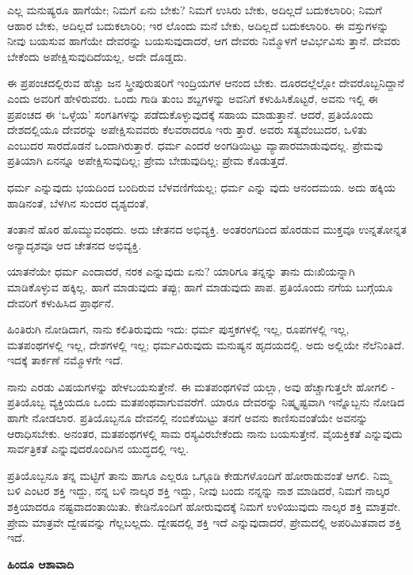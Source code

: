 ಎಲ್ಲ ಮನುಷ್ಯರೂ ಹಾಗೆಯೇ; ನಿಮಗೆ ಏನು ಬೇಕು? ನಿಮಗೆ ಉಸಿರು ಬೇಕು, ಅದಿಲ್ಲದೆ ಬದುಕಲಾರಿರಿ; ನಿಮಗೆ ಆಹಾರ ಬೇಕು, ಅದಿಲ್ಲದೆ ಬದುಕಲಾರಿರಿ; ಇರ ಲೊಂದು ಮನೆ ಬೇಕು, ಅದಿಲ್ಲದೆ ಬದುಕಲಾರಿರಿ. ಈ ವಸ್ತುಗಳನ್ನು ನೀವು ಬಯಸುವ ಹಾಗೆಯೇ ದೇವರನ್ನು ಬಯಸುವುದಾದರೆ, ಆಗ ದೇವರು ನಿಮ್ಮೊಳಗೆ ಆವಿರ್ಭವಿಸು ತ್ತಾನೆ. ದೇವರು ಬೇಕೆಂದು ಅಪೇಕ್ಷಿಸುವುದಿದೆಯಲ್ಲ, ಅದೇ ದೊಡ್ಡದು.

ಈ ಪ್ರಪಂಚದಲ್ಲಿರುವ ಹೆಚ್ಚು ಜನ ಸ್ತ್ರೀಪುರುಷರಿಗೆ ಇಂದ್ರಿಯಗಳ ಆನಂದ ಬೇಕು. ದೂರದಲ್ಲೆಲ್ಲೋ ದೇವರೊಬ್ಬನಿದ್ದಾನೆ ಎಂದು ಅವರಿಗೆ ಹೇಳಿರುವರು. ಒಂದು ಗಾಡಿ ತುಂಬ ಶಬ್ದಗಳನ್ನು ಅವನಿಗೆ ಕಳುಹಿಸಿಕೊಟ್ಟರೆ, ಅವನು ಇಲ್ಲಿ ಈ ಪ್ರಪಂಚದ ಈ ‘ಒಳ್ಳೆಯ’ ಸಂಗತಿಗಳನ್ನು ಪಡೆದುಕೊಳ್ಳುವುದಕ್ಕೆ ಸಹಾಯ ಮಾಡುತ್ತಾನೆ. ಆದರೆ, ಪ್ರತಿಯೊಂದು ದೇಶದಲ್ಲಿಯೂ ದೇವರನ್ನು ಅಪೇಕ್ಷಿಸುವವರು ಕೆಲವರಾದರೂ ಇರು ತ್ತಾರೆ. ಅವರು ಸತ್ಯವೆಂಬುದರ, ಒಳಿತು ಎಂಬುದರ ಸಾರದೊಡನೆ ಒಂದಾಗಿರುತ್ತಾರೆ. ಧರ್ಮ ಎಂದರೆ ಅಂಗಡಿಯಿಟ್ಟು ವ್ಯಾಪಾರಮಾಡುವುದಲ್ಲ. ಪ್ರೇಮವು ಪ್ರತಿಯಾಗಿ ಏನನ್ನೂ ಅಪೇಕ್ಷಿಸುವುದಿಲ್ಲ; ಪ್ರೇಮ ಬೇಡುವುದಿಲ್ಲ; ಪ್ರೇಮ ಕೊಡುತ್ತದೆ.

ಧರ್ಮ ಎನ್ನುವುದು ಭಯದಿಂದ ಬಂದಿರುವ ಬೆಳವಣಿಗೆಯಲ್ಲ; ಧರ್ಮ ಎನ್ನು ವುದು ಆನಂದಮಯ. ಅದು ಹಕ್ಕಿಯ ಹಾಡಿನಂತೆ, ಬೆಳಗಿನ ಸುಂದರ ದೃಶ್ಯದಂತೆ,

ತಂತಾನೆ ಹೊರ ಹೊಮ್ಮುವಂಥದು. ಅದು ಚೇತನದ ಅಭಿವ್ಯಕ್ತಿ. ಅಂತರಂಗದಿಂದ ಹೊರಡುವ ಮುಕ್ತವೂ ಉನ್ನತೋನ್ನತ ಅನ್ಯಾದೃಶವೂ ಆದ ಚೇತನದ ಅಭಿವ್ಯಕ್ತಿ.

ಯಾತನೆಯೇ ಧರ್ಮ ಎಂದಾದರೆ, ನರಕ ಎನ್ನುವುದು ಏನು? ಯಾರಿಗೂ ತನ್ನನ್ನು ತಾನು ದುಃಖಿಯನ್ನಾಗಿ ಮಾಡಿಕೊಳ್ಳುವ ಹಕ್ಕಿಲ್ಲ. ಹಾಗೆ ಮಾಡುವುದು ತಪ್ಪು; ಹಾಗೆ ಮಾಡುವುದು ಪಾಪ. ಪ್ರತಿಯೊಂದು ನಗೆಯ ಬುಗ್ಗೆಯೂ ದೇವರಿಗೆ ಕಳುಹಿಸಿದ ಪ್ರಾರ್ಥನೆ.

ಹಿಂತಿರುಗಿ ನೋಡಿದಾಗ, ನಾನು ಕಲಿತಿರುವುದು ಇದು: ಧರ್ಮ ಪುಸ್ತಕಗಳಲ್ಲಿ ಇಲ್ಲ, ರೂಪಗಳಲ್ಲಿ ಇಲ್ಲ, ಮತಪಂಥಗಳಲ್ಲಿ ಇಲ್ಲ, ದೇಶಗಳಲ್ಲಿ ಇಲ್ಲ; ಧರ್ಮವಿರುವುದು ಮನುಷ್ಯನ ಹೃದಯದಲ್ಲಿ. ಅದು ಅಲ್ಲಿಯೇ ನೆಲೆನಿಂತಿದೆ. ಇದಕ್ಕೆ ತಾರ್ಕಣೆ ನಮ್ಮೊಳಗೇ ಇದೆ.

ನಾನು ಎರಡು ವಿಷಯಗಳನ್ನು ಹೇಳಬಯಸುತ್ತೇನೆ. ಈ ಮತಪಂಥಗಳಿವೆ ಯಲ್ಲಾ, ಅವು ಹೆಚ್ಚಾಗುತ್ತಲೇ ಹೋಗಲಿ - ಪ್ರತಿಯೊಬ್ಬ ವ್ಯಕ್ತಿಯದೂ ಒಂದು ಮತಪಂಥವಾಗುವವರೆಗೆ. ಯಾರೂ ದೇವರನ್ನು ನಿಷ್ಕೃಷ್ಟವಾಗಿ ಇನ್ನೊಬ್ಬನು ನೋಡಿದ ಹಾಗೇ ನೋಡಲಾರ. ಪ್ರತಿಯೊಬ್ಬನೂ ದೇವನಲ್ಲಿ ನಂಬಿಕೆಯಿಟ್ಟು ತನಗೆ ಅವನು ಕಾಣಿಸುವಂತೆಯೇ ಅವನನ್ನು ಆರಾಧಿಸಬೇಕು. ಅನಂತರ, ಮತಪಂಥಗಳಲ್ಲಿ ಸಾಮ ರಸ್ಯವಿರಬೇಕೆಂದು ನಾನು ಬಯಸುತ್ತೇನೆ. ವೈಯಕ್ತಿಕತೆ ಎನ್ನುವುದು ಸಾರ್ವತ್ರಿಕತೆ ಎನ್ನುವುದರೊಂದಿಗಿನ ಯುದ್ಧದಲ್ಲಿ ಇಲ್ಲ.

ಪ್ರತಿಯೊಬ್ಬನೂ ತನ್ನ ಮಟ್ಟಿಗೆ ತಾನು ಹಾಗೂ ಎಲ್ಲರೂ ಒಗ್ಗೂಡಿ ಕೇಡುಗಳೊಂದಿಗೆ ಹೋರಾಡುವಂತೆ ಆಗಲಿ. ನಿಮ್ಮ ಬಳಿ ಎಂಟರ ಶಕ್ತಿ ಇದ್ದು, ನನ್ನ ಬಳಿ ನಾಲ್ಕರ ಶಕ್ತಿ ಇದ್ದು, ನೀವು ಬಂದು ನನ್ನನ್ನು ನಾಶ ಮಾಡಿದರೆ, ನಿಮಗೆ ನಾಲ್ಕರ ಶಕ್ತಿಯಾದರೂ ನಷ್ಟವಾದಂತಾಯಿತು. ಕೇಡಿನೊಂದಿಗೆ ಹೋರುವುದಕ್ಕೆ ನಿಮಗೆ ಉಳಿಯುವುದು ನಾಲ್ಕರ ಶಕ್ತಿ ಮಾತ್ರವೇ. ಪ್ರೇಮ ಮಾತ್ರವೇ ದ್ವೇಷವನ್ನು ಗೆಲ್ಲಬಲ್ಲದು. ದ್ವೇಷದಲ್ಲಿ ಶಕ್ತಿ ಇದೆ ಎನ್ನುವುದಾದರೆ, ಪ್ರೇಮದಲ್ಲಿ ಅಪರಿಮಿತವಾದ ಶಕ್ತಿ ಇದೆ.

\begin{center}
\textbf{ಹಿಂದೂ ಆಶಾವಾದಿ}
\end{center}

